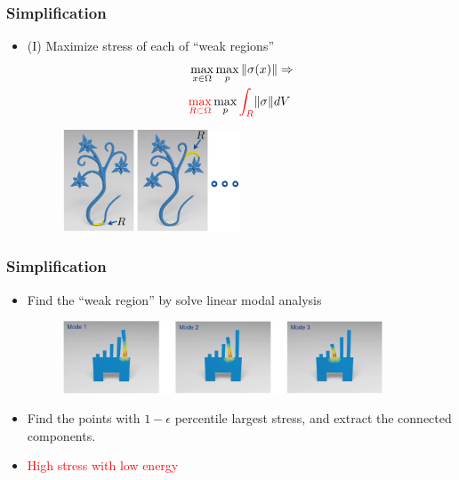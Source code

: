 \documentclass[serif,mathserif, 12pt]{beamer}
\newcommand{\TODO}[1]{\textcolor{red}{#1}}
\begin{document}
\begin{frame}
  \frametitle{Simplification}
  \begin{itemize}
  \item (I) Maximize stress of each of ``weak regions''
    \begin{equation*}
      \begin{split}
      &\max_{x \in \Omega} \max_{p} \|\sigma (x) \| \Rightarrow \\
      &\TODO{\max_{R\subset\Omega}} \max_{p} \TODO{\int_R} \|\sigma\| dV
      \end{split}
    \end{equation*}
    \begin{figure}
      \centering
      \includegraphics[width=0.5\textwidth]{img/weak_regions}
    \end{figure}
  \end{itemize}
\end{frame}

\begin{frame}
  \frametitle{Simplification}
  \begin{itemize}
  \item Find the ``weak region'' by solve linear modal analysis
    \begin{figure}
      \centering
      \includegraphics[width=0.9\textwidth]{img/lma_modes}
    \end{figure}
  \item Find the points with $1-\epsilon$ percentile largest stress, and
    extract the connected components.
    \pause
  \item \TODO{High stress with low energy}
  \end{itemize}
\end{frame}
\end{document}
